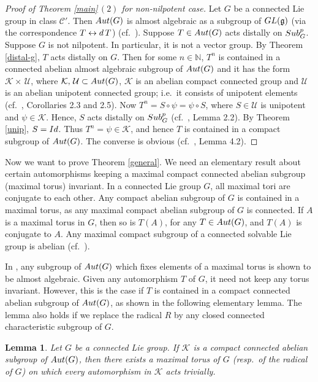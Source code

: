 \documentclass{amsart}
\numberwithin{equation}{section}
\newcommand{\Aut}{{\rm Aut}}
\newcommand{\N}{{\mathbb N}}
\newcommand{\gf}{{\mathfrak g}}
\newcommand{\K}{{\mathcal K}}
\newcommand{\U}{{\mathcal U}}
\newcommand{\spg}{{\rm Sub}^p_G}
\newcommand{\du}{{\rm d\,}}
\newcommand{\Id}{{\rm Id}}
\newcommand{\GL}{{\rm GL}}
\newtheorem{lem}[thm]{Lemma}
\theoremstyle{remark}
\newcommand{\cp}{{\mathcal{C}'}}
\begin{document}
\begin{proof}[Proof of Theorem \ref{main}\,$(2)$ for non-nilpotent case]
Let $G$ be a connected Lie group in class $\cp$. Then $\Aut(G)$ is almost algebraic as a subgroup 
of $\GL(\gf)$ (via the correspondence $T\leftrightarrow \du T$) (cf.\ \cite{D}). Suppose $T\in\Aut(G)$ acts 
distally on $\spg$. Suppose $G$ is not nilpotent. In particular, it is not a vector group.  
By Theorem \ref{distal-g}, $T$ acts distally on $G$. Then for some $n\in\N$, $T^n$ is contained in a connected 
abelian almost algebraic subgroup of $\Aut(G)$ and it has the form $\K\times\,\U$, where $\K,\,\U\subset\Aut(G)$, 
$\K$ is an abelian compact connected group and $\U$ is an abelian unipotent connected group; i.e.\ it consists of 
unipotent elements (cf.\ \cite{Ab1}, Corollaries 2.3 and 2.5). Now $T^n=S\circ\psi=\psi\circ S$, where $S\in\U$ is unipotent 
and $\psi\in\K$. Hence, $S$ acts distally on $\spg$ (cf.\ \cite{SY2}, Lemma 2.2). By Theorem \ref{unip}, $S=\Id$. 
Thus $T^n=\psi\in\K$, and hence $T$ is contained in a compact subgroup of $\Aut(G)$. 
The converse is obvious (cf.\ \cite{PaS}, Lemma 4.2).
\end{proof}

Now we want to prove Theorem \ref{general}.  We need an elementary result about certain automorphisms keeping 
a maximal compact connected abelian subgroup (maximal torus) invariant.  In a connected Lie group $G$, all maximal tori 
are conjugate to each other. Any compact abelian subgroup of $G$ is contained in a maximal torus, as    
any maximal compact abelian subgroup of $G$ is connected. If $A$ is a maximal torus in $G$, then so is $T(A)$, 
for any $T\in\Aut(G)$, and $T(A)$ is conjugate to $A$. Any maximal compact subgroup of a connected solvable Lie 
group is abelian (cf.\ \cite{I}).
 
 In \cite{DS2}, any subgroup of $\Aut(G)$ which fixes elements of a maximal torus is shown to be almost algebraic. 
 Given any automorphism $T$ of $G$, it need not keep any torus invariant. However, this is the case if $T$ is contained 
 in a compact connected abelian subgroup of $\Aut(G)$, as shown in the following elementary lemma. The lemma also 
 holds if we replace the radical $R$ by any closed connected characteristic subgroup of $G$. 

\begin{lem} \label{aut-inv} Let $G$ be a connected Lie group. If $\K$ is a compact connected abelian subgroup 
of $\Aut(G)$, then there exists a maximal torus of $G$ \rm{(}resp.\ of the radical of $G$\rm{)}  on which every 
automorphism in $\K$ acts trivially. 
\end{lem}
\end{document}
